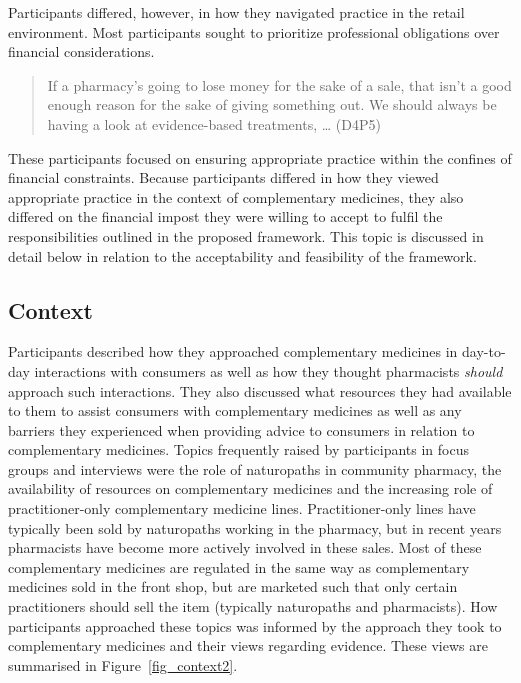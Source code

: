 \documentclass[12pt,]{article}
\begin{document}
Participants differed, however, in how they navigated practice in the
retail environment. Most participants sought to prioritize professional
obligations over financial considerations.

\begin{quote}
If a pharmacy's going to lose money for the sake of a sale, that isn't a
good enough reason for the sake of giving something out. We should
always be having a look at evidence-based treatments, \ldots{} (D4P5)
\end{quote}

These participants focused on ensuring appropriate practice within the
confines of financial constraints. Because participants differed in how
they viewed appropriate practice in the context of complementary
medicines, they also differed on the financial impost they were willing
to accept to fulfil the responsibilities outlined in the proposed
framework. This topic is discussed in detail below in relation to the
acceptability and feasibility of the framework.

\subsection{Context}\label{context}

Participants described how they approached complementary medicines in
day-to-day interactions with consumers as well as how they thought
pharmacists \emph{should} approach such interactions. They also
discussed what resources they had available to them to assist consumers
with complementary medicines as well as any barriers they experienced
when providing advice to consumers in relation to complementary
medicines. Topics frequently raised by participants in focus groups and
interviews were the role of naturopaths in community pharmacy, the
availability of resources on complementary medicines and the increasing
role of practitioner-only complementary medicine lines.
Practitioner-only lines have typically been sold by naturopaths working
in the pharmacy, but in recent years pharmacists have become more
actively involved in these sales. Most of these complementary medicines
are regulated in the same way as complementary medicines sold in the
front shop, but are marketed such that only certain practitioners should
sell the item (typically naturopaths and pharmacists). How participants
approached these topics was informed by the approach they took to
complementary medicines and their views regarding evidence. These views
are summarised in Figure~\ref{fig_context2}.
\end{document}
